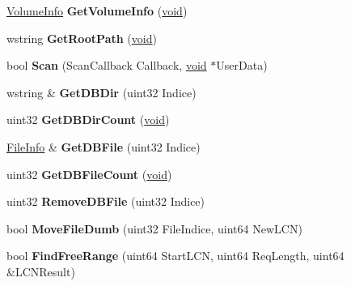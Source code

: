 \begin{DoxyCompactItemize}
\item 
\mbox{\label{class_drive_volume_a486c3bf6534668339edc6b3e6f3e3b38}} 
\hyperlink{struct_volume_info}{Volume\+Info} {\bfseries Get\+Volume\+Info} (\hyperlink{interfacevoid}{void})
\item 
\mbox{\label{class_drive_volume_aff58c5bf0d1826bf68a18717e6ffc9fd}} 
wstring {\bfseries Get\+Root\+Path} (\hyperlink{interfacevoid}{void})
\item 
\mbox{\label{class_drive_volume_ab8b739f0ce0242b1e8559b02a69c4a71}} 
bool {\bfseries Scan} (Scan\+Callback Callback, \hyperlink{interfacevoid}{void} $\ast$User\+Data)
\item 
\mbox{\label{class_drive_volume_a4e1f2cd912b21314689ea9d29dcb20c3}} 
wstring \& {\bfseries Get\+D\+B\+Dir} (uint32 Indice)
\item 
\mbox{\label{class_drive_volume_aa3d38b89939bb8c7a3c5a010ae4d0072}} 
uint32 {\bfseries Get\+D\+B\+Dir\+Count} (\hyperlink{interfacevoid}{void})
\item 
\mbox{\label{class_drive_volume_a0fff44adf5d66a4a58aa3fb9aebffcf1}} 
\hyperlink{struct_file_info}{File\+Info} \& {\bfseries Get\+D\+B\+File} (uint32 Indice)
\item 
\mbox{\label{class_drive_volume_a4c722ce43020857946d94681e58d19b3}} 
uint32 {\bfseries Get\+D\+B\+File\+Count} (\hyperlink{interfacevoid}{void})
\item 
\mbox{\label{class_drive_volume_ac1e25a968ee3fa9d7fecf61c5046b409}} 
uint32 {\bfseries Remove\+D\+B\+File} (uint32 Indice)
\item 
\mbox{\label{class_drive_volume_aa870d49c3159e0aca2025ca7d53f2a48}} 
bool {\bfseries Move\+File\+Dumb} (uint32 File\+Indice, uint64 New\+L\+CN)
\item 
\mbox{\label{class_drive_volume_aaf668049540aba99b89f7b5b590046c7}} 
bool {\bfseries Find\+Free\+Range} (uint64 Start\+L\+CN, uint64 Req\+Length, uint64 \&L\+C\+N\+Result)
\end{DoxyCompactItemize}
